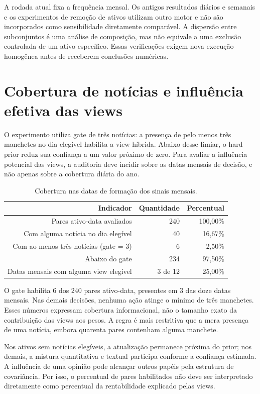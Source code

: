 A rodada atual fixa a frequência mensal. Os antigos resultados diários e semanais e os experimentos de remoção de ativos utilizam outro motor e não são incorporados como sensibilidade diretamente comparável. A dispersão entre subconjuntos é uma análise de composição, mas não equivale a uma exclusão controlada de um ativo específico. Essas verificações exigem nova execução homogênea antes de receberem conclusões numéricas.


\section{Cobertura de notícias e influência efetiva das views}
O experimento utiliza gate de três notícias: a presença de pelo menos três manchetes no dia elegível habilita a view híbrida. Abaixo desse limiar, o hard prior reduz sua confiança a um valor próximo de zero. Para avaliar a influência potencial das views, a auditoria deve incidir sobre as datas mensais de decisão, e não apenas sobre a cobertura diária do ano.

\begin{table}[H]
\centering
\caption{Cobertura nas datas de formação dos sinais mensais.}
{\footnotesize
\begin{tabular}{@{}rrr@{}}
\hline
Indicador & Quantidade & Percentual \\ \hline
Pares ativo-data avaliados & 240 & 100,00\% \\
Com alguma notícia no dia elegível & 40 & 16,67\% \\
Com ao menos três notícias (gate = 3) & 6 & 2,50\% \\
Abaixo do gate & 234 & 97,50\% \\
Datas mensais com alguma view elegível & 3 de 12 & 25,00\% \\
\hline
\end{tabular}}
\par{}
\end{table}
O gate habilita 6 dos 240 pares ativo-data, presentes em 3 das doze datas mensais. Nas demais decisões, nenhuma ação atinge o mínimo de três manchetes. Esses números expressam cobertura informacional, não o tamanho exato da contribuição das views aos pesos. A regra é mais restritiva que a mera presença de uma notícia, embora quarenta pares contenham alguma manchete.

Nos ativos sem notícias elegíveis, a atualização permanece próxima do prior; nos demais, a mistura quantitativa e textual participa conforme a confiança estimada. A influência de uma opinião pode alcançar outros papéis pela estrutura de covariância. Por isso, o percentual de pares habilitados não deve ser interpretado diretamente como percentual da rentabilidade explicado pelas views.


